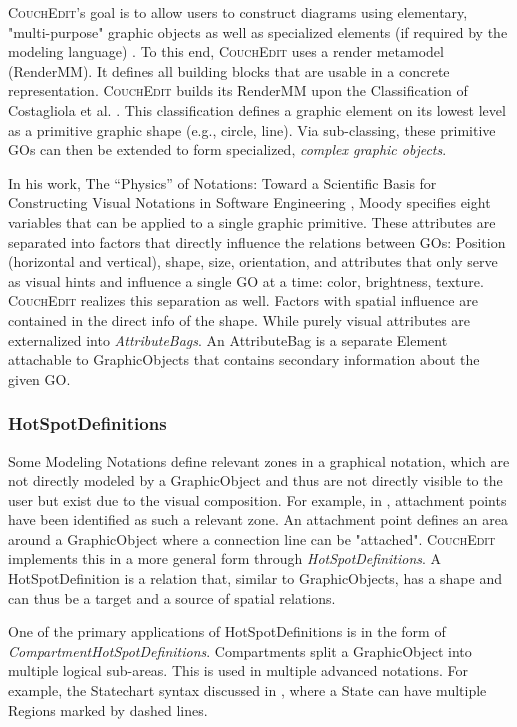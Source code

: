 \textsc{CouchEdit}'s goal is to allow users to construct diagrams using elementary, "multi-purpose" graphic objects as well as specialized elements (if required by the modeling language) \cite{nachreiner_couchedit_2020}. To this end, \textsc{CouchEdit} uses a render metamodel (RenderMM). It defines all building blocks that are usable in a concrete representation. \textsc{CouchEdit} builds its RenderMM upon the Classification of Costagliola et al. \cite{costagliola_classification_2002}. This classification defines a graphic element on its lowest level as a primitive graphic shape (e.g., circle, line). Via sub-classing, these primitive GOs can then be extended to form specialized, \emph{complex graphic objects}.

In his work, The “Physics” of Notations: Toward a Scientific Basis for Constructing Visual Notations in Software Engineering \cite{moody_physics_2009}, Moody specifies eight variables that can be applied to a single graphic primitive. These attributes are separated into factors that directly influence the relations between GOs:  Position (horizontal and vertical), shape, size, orientation, and attributes that only serve as visual hints and influence a single GO at a time: color, brightness, texture. \textsc{CouchEdit} realizes this separation as well. Factors with spatial influence are contained in the direct info of the shape. While purely visual attributes are externalized into \emph{AttributeBags}. An AttributeBag is a separate Element attachable to GraphicObjects that contains secondary information about the given GO.

\subsubsection{HotSpotDefinitions}
\label{sec:hotspotdefinitions}
Some Modeling Notations define relevant zones in a graphical notation, which are not directly modeled by a GraphicObject and thus are not directly visible to the user but exist due to the visual composition. For example, in \cite{bottoni_suite_2004}, attachment points have been identified as such a relevant zone. An attachment point defines an area around a GraphicObject where a connection line can be "attached". \textsc{CouchEdit} implements this in a more general form through \emph{HotSpotDefinitions}. A HotSpotDefinition is a relation that, similar to GraphicObjects, has a shape and can thus be a target and a source of spatial relations.

One of the primary applications of HotSpotDefinitions is in the form of \emph{CompartmentHotSpotDefinitions}. Compartments split a GraphicObject into multiple logical sub-areas. This is used in multiple advanced notations. For example, the Statechart syntax discussed in , where a State can have multiple Regions marked by dashed lines. 

